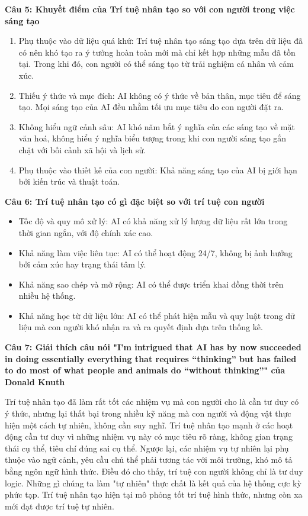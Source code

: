 \textbf{Câu 5: Khuyết điểm của Trí tuệ nhân tạo so với con người trong việc sáng tạo}

\begin{enumerate}
	\item Phụ thuộc vào dữ liệu quá khứ: Trí tuệ nhân tạo sáng tạo dựa trên dữ liệu đã có nên khó tạo ra ý tưởng hoàn toàn mới mà chỉ kết hợp những mẫu đã tồn tại. Trong khi đó, con người có thể sáng tạo từ trải nghiệm cá nhân và cảm xúc.
	
	\item Thiếu ý thức và mục đích: AI không có ý thức về bản thân, mục tiêu để sáng tạo. Mọi sáng tạo của AI đều nhằm tối ưu mục tiêu do con người đặt ra.
	
	\item Không hiểu ngữ cảnh sâu: AI khó năm bắt ý nghĩa của các sáng tạo về mặt văn hoá, không hiểu ý nghĩa biểu tượng trong khi con người sáng tạo gắn chặt với bối cảnh xã hội và lịch sử.
	
	\item Phụ thuộc vào thiết kế của con người: Khả năng sáng tạo của AI bị giới hạn bởi kiến trúc và thuật toán.
\end{enumerate}

\textbf{Câu 6: Trí tuệ nhân tạo có gì đặc biệt so với trí tuệ con người}

\begin{itemize}
	\item Tốc độ và quy mô xử lý: AI có khả năng xử lý lượng dữ liệu rất lớn trong thời gian ngắn, với độ chính xác cao.
	
	\item Khả năng làm việc liên tục: AI có thể hoạt động 24/7, không bị ảnh hưởng bởi cảm xúc hay trạng thái tâm lý.
	
	\item Khả năng sao chép và mở rộng: AI có thể được triển khai đồng thời trên nhiều hệ thống.
	
	\item Khả năng học từ dữ liệu lớn: AI có thể phát hiện mẫu và quy luật trong dữ liệu mà con người khó nhận ra và ra quyết định dựa trên thống kê.
\end{itemize}

\textbf{Câu 7: Giải thích câu nói "I’m intrigued that AI has by now succeeded in doing essentially everything that requires “thinking” but has failed to do most of what people and animals do “without thinking”" của Donald Knuth}

Trí tuệ nhân tạo đã làm rất tốt các nhiệm vụ mà con người cho là cần tư duy có ý thức, nhưng lại thất bại trong nhiều kỹ năng mà con người và động vật thực hiện một cách tự nhiên, không cần suy nghĩ. Trí tuệ nhân tạo mạnh ở các hoạt động cần tư duy vì những nhiệm vụ này có mục tiêu rõ ràng, không gian trạng thái cụ thể, tiêu chí đúng sai cụ thể. Ngược lại, các nhiệm vụ tự nhiên lại phụ thuộc vào ngữ cảnh, yêu cầu chủ thể phải tương tác với môi trường, khó mô tả bằng ngôn ngữ hình thức. Điều đó cho thấy, trí tuệ con người không chỉ là tư duy logic. Những gì chúng ta làm "tự nhiên" thực chất là kết quả của hệ thống cực kỳ phức tạp. Trí tuệ nhân tạo hiện tại mô phỏng tốt trí tuệ hình thức, nhưng còn xa mới đạt được trí tuệ tự nhiên.

